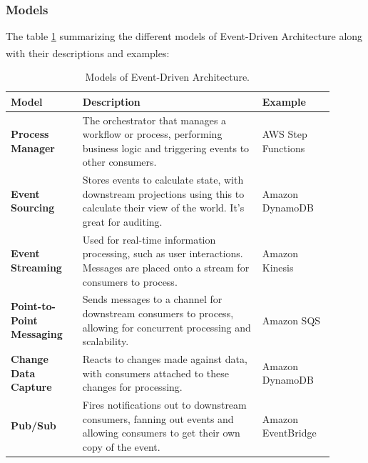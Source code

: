 \subsubsection{Models}
The table \ref{tab:eda_models} summarizing the different models of Event-Driven Architecture
along with their descriptions and examples\textsuperscript{\cite{event_5}}:

\newpage

\begin{table}
    \centering
    \begin{tabular}{|p{0.2\linewidth}|p{0.5\linewidth}|p{0.2\linewidth}|}
        \hline
        \textbf{Model}                    & \textbf{Description}                                                                                                                    & \textbf{Example}   \\ \hline
        \textbf{Process Manager}          & The orchestrator that manages a workflow or process, performing business logic and triggering events to other consumers.                & AWS Step Functions \\ \hline
        \textbf{Event Sourcing}           & Stores events to calculate state, with downstream projections using this to calculate their view of the world. It's great for auditing. & Amazon DynamoDB    \\ \hline
        \textbf{Event Streaming}          & Used for real-time information processing, such as user interactions. Messages are placed onto a stream for consumers to process.       & Amazon Kinesis     \\ \hline
        \textbf{Point-to-Point Messaging} & Sends messages to a channel for downstream consumers to process, allowing for concurrent processing and scalability.                    & Amazon SQS         \\ \hline
        \textbf{Change Data Capture}      & Reacts to changes made against data, with consumers attached to these changes for processing.                                           & Amazon DynamoDB    \\ \hline
        \textbf{Pub/Sub}                  & Fires notifications out to downstream consumers, fanning out events and allowing consumers to get their own copy of the event.          & Amazon EventBridge \\ \hline
    \end{tabular}
    \caption{Models of Event-Driven Architecture.}
    \label{tab:eda_models}
\end{table}


